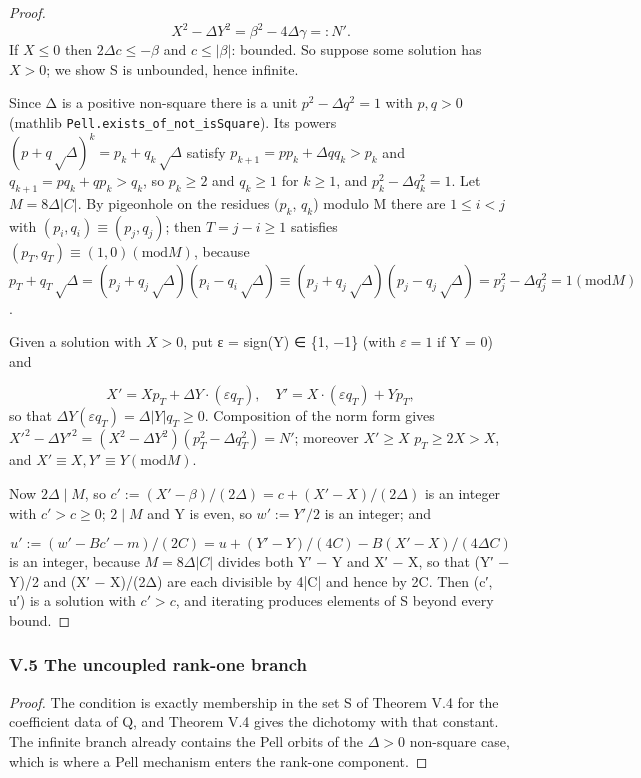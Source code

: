 \documentclass[11pt]{article}
\theoremstyle{plain}
\theoremstyle{definition}
\theoremstyle{remark}
\theoremstyle{plain}
\theoremstyle{definition}
\theoremstyle{remark}
\newcounter{Part}
\theoremstyle{plain}
\newtheorem{corollaryPart}[Part]{Corollary}
\theoremstyle{definition}
\theoremstyle{remark}
\begin{document}
\begin{proof}
\[
X^{2} − ΔY^{2} = β^{2} − 4Δγ =: N′.
\]
If $X ≤ 0$ then $2Δc ≤ −β$ and $c ≤ |β|$: bounded. So suppose some solution has $X > 0$; we show S is unbounded, hence infinite.

Since Δ is a positive non-square there is a unit $p^{2} − Δq^{2} = 1$ with $p, q > 0$ (mathlib \texttt{Pell.\allowbreak{}exists\_\allowbreak{}of\_\allowbreak{}not\_\allowbreak{}isSquare}). Its powers $(p + q√Δ)^{k} = p_{k} + q_{k}√Δ$ satisfy $p_{k+1} = p p_{k} + Δ q q_{k} > p_{k}$ and $q_{k+1} = p q_{k} + q p_{k} > q_{k}$, so $p_{k} ≥ 2$ and $q_{k} ≥ 1$ for $k ≥ 1$, and $p_{k}^{2} − Δq_{k}^{2} = 1$. Let $M = 8Δ|C|$. By pigeonhole on the residues $(p_{k}$, $q_{k}$) modulo M there are $1 ≤ i < j$ with $(p_{i}, q_{i}) ≡ (p_{j}, q_{j})$; then $T = j − i ≥ 1$ satisfies $(p_{T}, q_{T}) ≡ (1, 0) (\mathrm{mod} M)$, because $p_{T} + q_{T}√Δ = (p_{j} + q_{j}√Δ)(p_{i} − q_{i}√Δ) ≡ (p_{j} + q_{j}√Δ)(p_{j} − q_{j}√Δ) = p_{j}^{2} − Δq_{j}^{2} = 1 (\mathrm{mod} M)$.

Given a solution with $X > 0$, put ε = sign(Y) ∈ \{1, −1\} (with $ε = 1$ if Y = 0) and

\[
X′ = X p_{T} + ΔY·(εq_{T}), \quad Y′ = X·(εq_{T}) + Y p_{T},
\]
so that $ΔY(εq_{T}) = Δ|Y|q_{T} ≥ 0$. Composition of the norm form gives $X′^{2} − ΔY′^{2} = (X^{2} − ΔY^{2})(p_{T}^{2} − Δq_{T}^{2}) = N′$; moreover $X′ ≥ X$ $p_{T} ≥ 2X > X$, and $X′ ≡ X, Y′ ≡ Y (\mathrm{mod} M)$.

Now $2Δ ∣ M$, so $c′ := (X′ − β)/(2Δ) = c + (X′ − X)/(2Δ)$ is an integer with $c′ > c ≥ 0$; $2 ∣ M$ and Y is even, so $w′ := Y′/2$ is an integer; and

\[
u′ := (w′ − Bc′ − m)/(2C) = u + (Y′ − Y)/(4C) − B(X′ − X)/(4ΔC)
\]
is an integer, because $M = 8Δ|C|$ divides both Y′ − Y and X′ − X, so that (Y′ − Y)/2 and (X′ − X)/(2Δ) are each divisible by 4|C| and hence by 2C. Then (c′, u′) is a solution with $c′ > c$, and iterating produces elements of S beyond every bound.

\end{proof}
\subsubsection*{V.5 The uncoupled rank-one branch}
\begin{proof}
The condition is exactly membership in the set S of Theorem V.4 for the coefficient data of Q, and Theorem V.4 gives the dichotomy with that constant. The infinite branch already contains the Pell orbits of the $Δ > 0$ non-square case, which is where a Pell mechanism enters the rank-one component.
\end{proof}
\end{document}
